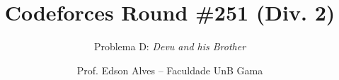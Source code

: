 \title{Codeforces Round \#251 (Div. 2)}
\subtitle{Problema D: \textit{Devu and his Brother}}
\date{}
\author{Prof. Edson Alves -- Faculdade UnB Gama}
